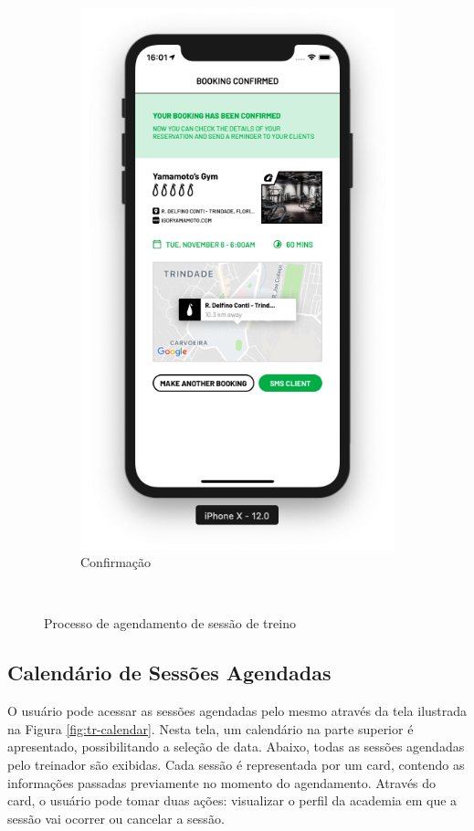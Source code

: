 \begin{figure}[H]
\begin{subfigure}[b]{0.3\textwidth}
        \includegraphics[width=\textwidth]{pfc/figuras/tr-booking-confirmed.png}
        \caption{Confirmação}
        \label{fig:tr-booking-confirmed}
    \end{subfigure}
    ~
    \caption{Processo de agendamento de sessão de treino}
    \label{fig:tr-booking}
\end{figure}

\subsection{Calendário de Sessões Agendadas}
O usuário pode acessar as sessões agendadas pelo mesmo através da tela ilustrada na Figura \ref{fig:tr-calendar}. Nesta tela, um calendário na parte superior é apresentado, possibilitando a seleção de data. Abaixo, todas as sessões agendadas pelo treinador são exibidas. Cada sessão é representada por um card, contendo as informações passadas previamente no momento do agendamento. Através do card, o usuário pode tomar duas ações: visualizar o perfil da academia em que a sessão vai ocorrer ou cancelar a sessão.


